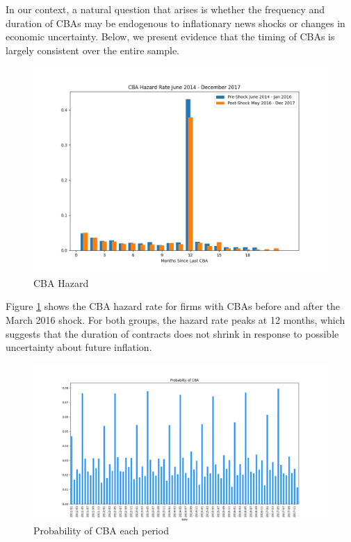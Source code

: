 \documentclass[12pt]{article}
\begin{document}
		In our context, a natural question that arises is whether the frequency and duration of CBAs may be endogenous to inflationary news shocks or changes in economic uncertainty. Below, we present evidence that the timing of CBAs is largely consistent over the entire sample.  
	\begin{figure}[!ht]
		\centering
		\caption{CBA Hazard}
		\label{fig:CBAHazard}	
		\includegraphics[scale = .72]{tables-figures/cba_hazard.png}
		\end{figure}
		Figure \ref{fig:CBAHazard} shows the CBA hazard rate for firms with CBAs before and after the March 2016 shock. For both groups, the hazard rate peaks at 12 months, which suggests that the duration of contracts does not shrink in response to possible uncertainty about future inflation. 

		\begin{figure}[!ht]
			\centering
			\caption{Probability of CBA each period}
			\label{fig:CBAProb}
			\includegraphics[scale = .5]{tables-figures/cba_probability.png}
		\end{figure}
\end{document}
